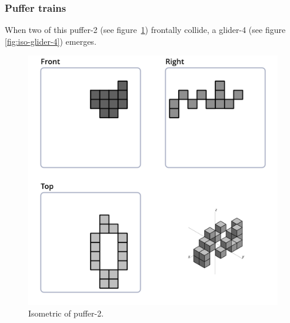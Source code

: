 \subsubsection{Puffer trains}
When two of this puffer-2 (see figure~\ref{fig:iso-puffer-2}) frontally collide,
a glider-4 (see figure \ref{fig:iso-glider-4}) emerges.
\begin{figure}
	\centering
	\includegraphics[scale=0.4]{iso_settings/puffer_2.png}
	\caption{Isometric of puffer-2.}
  \label{fig:iso-puffer-2}
\end{figure}
